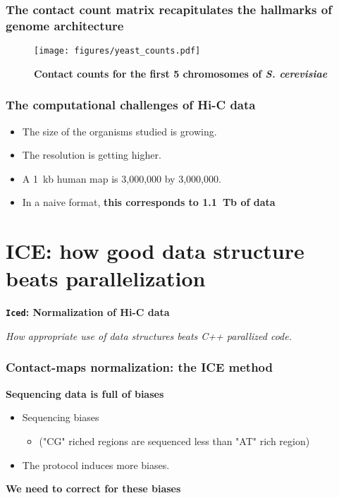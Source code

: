 \documentclass[xcolor=dvipsnames]{beamer}
\begin{document}
\begin{frame}
\frametitle{The contact count matrix recapitulates the hallmarks of genome
architecture}
\vspace{-1em}
\begin{figure}
\texttt{[image: figures/yeast\_counts.pdf]}
\caption{\textbf{Contact counts for the first 5 chromosomes of \textit{S.
cerevisiae}}}
\end{figure}
\end{frame}

\begin{frame}
\frametitle{The computational challenges of Hi-C data}
\begin{itemize}[label={$\bullet$}]
\item The size of the organisms studied is growing.
\item The resolution is getting higher.
\item A 1~kb human map is 3,000,000 by 3,000,000.
\item In a naive format, {\bf this corresponds to 1.1~Tb of data}
\end{itemize}
\end{frame}


\section{ICE: how good data structure beats parallelization}
\begin{frame}
\Large{ \bf
\texttt{Iced}: Normalization of Hi-C data}

\begin{flushright}
\vspace{1em}
\small
\textit{How appropriate use of data structures beats C++ parallized code.}
\end{flushright}
\end{frame}

\begin{frame}
\frametitle{Contact-maps normalization: the ICE method}

{\bf \color{Blue} Sequencing data is full of biases}

\begin{itemize}[label={$\bullet$}]
\item Sequencing biases
\begin{itemize}
\item ("CG" riched regions are sequenced less than "AT" rich region)
\end{itemize}
\item The protocol induces more biases.
\end{itemize}
\vspace{3em}

\begin{center}
{\bf \color{Blue} We need to correct for these biases}
\end{center}

\end{frame}
\end{document}
